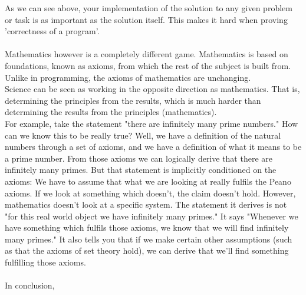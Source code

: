 \documentclass[a4paper,12pt]{article}
\begin{document}
As we can see above, your implementation of the solution to any given problem or task is as important as the solution itself. This makes it hard when proving 'correctness of a program'. \\
\\
Mathematics however is a completely different game. Mathematics is based on foundations, known as axioms, from which the rest of the subject is built from.  Unlike in programming, the axioms of mathematics are unchanging. \\
Science can be seen as working in the opposite direction as mathematics. That is, determining the principles from the results, which is much harder than determining the results from the principles (mathematics).\\
For example, take the statement "there are infinitely many prime numbers." How can we know this to be really true? Well, we have a definition of the natural numbers through a set of axioms, and we have a definition of what it means to be a prime number. From those axioms we can logically derive that there are infinitely many primes. But that statement is implicitly conditioned on the axioms: We have to assume that what we are looking at really fulfils the Peano axioms. If we look at something which doesn't, the claim doesn't hold. However, mathematics doesn't look at a specific system. The statement it derives is not "for this real world object we have infinitely many primes." It says "Whenever we have something which fulfils those axioms, we know that we will find infinitely many primes." It also tells you that if we make certain other assumptions (such as that the axioms of set theory hold), we can derive that we'll find something fulfilling those axioms.\\
\\
In conclusion, 
 
\end{document}
